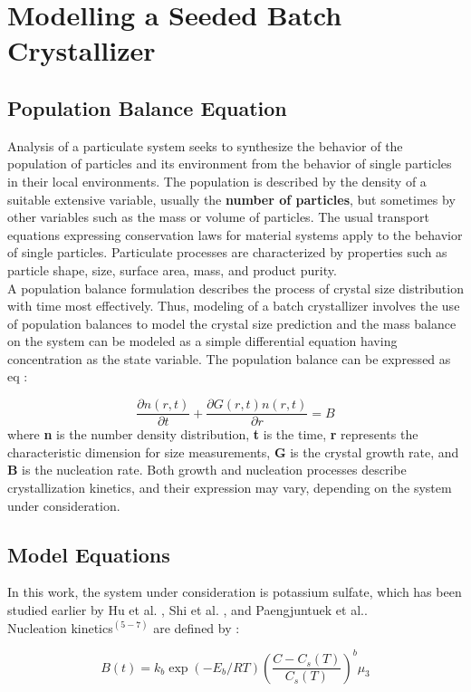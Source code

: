
\chapter{Modelling a Seeded Batch Crystallizer}


\section{Population Balance Equation}

Analysis of a particulate system seeks to synthesize the behavior of the population of particles and its environment from the behavior of single particles in their local environments. The population is described by the density of a suitable extensive variable, usually the \textbf{number of particles}, but sometimes by other variables such as the mass or volume of particles. The usual transport equations expressing conservation laws for material systems apply to the behavior of single particles. Particulate processes are characterized by properties such as particle shape, size, surface area, mass, and product purity. \\
A population balance formulation describes the process of crystal size distribution with time most effectively. Thus, modeling of a batch crystallizer involves the use of population balances to model the crystal size prediction and the mass balance on the system can be modeled as a simple differential equation having concentration as the state variable.
The population balance can be expressed as eq :

\begin{equation}
	\frac{\partial{n(r,t)}}{\partial{t}} + \frac{\partial{G(r,t)n(r,t)}}{\partial{r}} = B

\end{equation}
where \textbf{n} is the number density distribution, \textbf{t} is the time, \textbf{r} represents the characteristic dimension for size measurements, \textbf{G} is the crystal growth rate, and \textbf{B} is the nucleation rate. Both growth and nucleation processes describe crystallization kinetics, and their expression may vary, depending on the system under consideration.

\section{Model Equations}

In this work, the system under consideration is potassium sulfate, which has been studied earlier by Hu et al. \cite{hu}, Shi et al. \cite{shi}, and Paengjuntuek et al.\cite{paeng}. \\

Nucleation kinetics$^{(5-7)}$ are defined by :

\begin{equation*}

B(t) = k_{b}\exp{\left(-E_{b}/RT \right)}\left(\frac{C - C_{s}(T)}{C_{s}(T)}\right)^{b}\mu_{3}

\end{equation*}    
